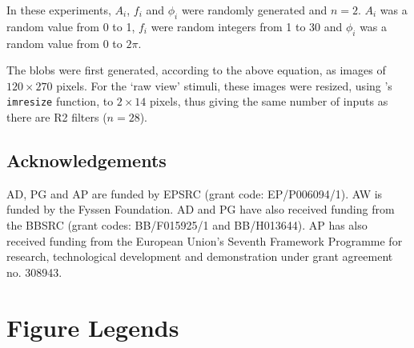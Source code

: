 In these experiments, $A_i$, $f_i$ and $\phi_i$ were randomly generated and $n=2$.
$A_i$ was a random value from 0 to 1, $f_i$ were random integers from 1 to 30 and $\phi_i$ was a random value from 0 to $2\pi$.
\begin{comment}
nvar = 1000;
nwave = 2;
maxfreq = 30;
maxamp = 1;
\end{comment}

The blobs were first generated, according to the above equation, as images of $120\times 270$ pixels.
For the `raw view' stimuli, these images were resized, using \Matlab's \texttt{imresize} function, to $2\times 14$ pixels, thus giving the same number of inputs as there are R2 filters ($n=28$).

\begin{comment}
\subsubsection*{Grading performance of neural networks}
The performance of neural networks was graded by calculating the \ac{rms} difference between the matrix of true values for the parameters with the network's output:
$$
E(\mathbf{y},\mathbf{t}) = \sqrt{\frac{\sum\limits_{i=1}^{n} (\mathbf{y}_i-\mathbf{t}_i)^2}{n}}
$$
where $E(\mathbf{y},\mathbf{t})$ is the mean error score, computed from the vector of outputs given by the network, $\mathbf{y}$, and the vector of true values, $\mathbf{t}$.
Hence, for a network that computed the values of all parameters accurately, a graph of the network's output \emph{vs.} the true values would give the line $y=x$ and an error score of 0 over the whole range of values.
\end{comment}

\subsection*{Acknowledgements}
AD, PG and AP are funded by EPSRC (grant code: EP/P006094/1).
AW is funded by the Fyssen Foundation.
AD and PG have also received funding from the BBSRC (grant codes: BB/F015925/1 and BB/H013644).
AP has also received funding from the European Union’s Seventh Framework Programme for research, technological development and demonstration under grant agreement no. 308943.



\newpage
\section*{Figure Legends}
%

